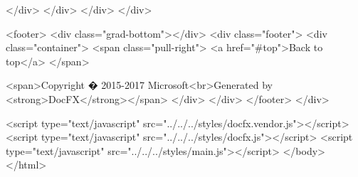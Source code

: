             </div>
          </div>
        </div>
      </div>
      
      <footer>
        <div class="grad-bottom"></div>
        <div class="footer">
          <div class="container">
            <span class="pull-right">
              <a href="#top">Back to top</a>
            </span>
            
            <span>Copyright � 2015-2017 Microsoft<br>Generated by <strong>DocFX</strong></span>
          </div>
        </div>
      </footer>
    </div>
    
    <script type="text/javascript" src="../../../styles/docfx.vendor.js"></script>
    <script type="text/javascript" src="../../../styles/docfx.js"></script>
    <script type="text/javascript" src="../../../styles/main.js"></script>
  </body>
</html>
